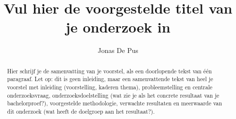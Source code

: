 \documentclass{hogent-article}
\title{Vul hier de voorgestelde titel van je onderzoek in}
\author{Jonas De Pus}
\begin{document}
\begin{abstract}
  Hier schrijf je de samenvatting van je voorstel, als een doorlopende tekst van één paragraaf. Let op: dit is geen inleiding, maar een samenvattende tekst van heel je voorstel met inleiding (voorstelling, kaderen thema), probleemstelling en centrale onderzoeksvraag, onderzoeksdoelstelling (wat zie je als het concrete resultaat van je bachelorproef?), voorgestelde methodologie, verwachte resultaten en meerwaarde van dit onderzoek (wat heeft de doelgroep aan het resultaat?).
\end{abstract}

\tableofcontents



\printbibliography[heading=bibintoc]
\end{document}
